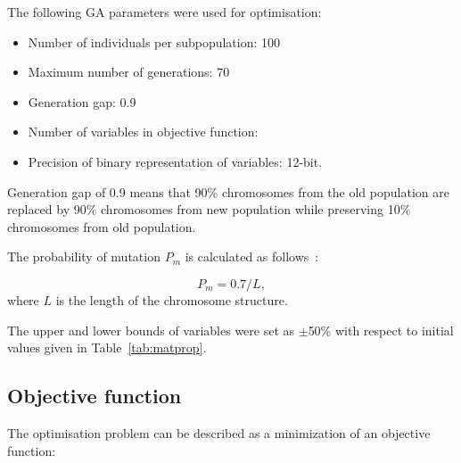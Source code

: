 	The following GA parameters were used for optimisation:
	\begin{itemize}
		\item Number of individuals per subpopulation: 100
		\item Maximum number of generations: 70
		\item Generation gap: 0.9
		\item Number of variables in objective function:  
		\item Precision of binary representation of variables: 12-bit.
   \end{itemize}
    Generation gap of 0.9 means that 90\% chromosomes from the old population are replaced by 90\%   chromosomes from new population while preserving 10\%   chromosomes from  old population.
    
    The probability of mutation \(P_m\) is calculated as follows~\cite{Chipperfield1994}:
    
\begin{equation}
    	P_m = 0.7/L,
    \end{equation}
 where \(L\) is the length of the chromosome structure.

The upper and lower bounds of variables were set as \(\pm\)50\% with respect to initial values given in Table~\ref{tab:matprop}.

\subsection{Objective function}
	
	The optimisation problem can be described as a minimization of an objective function:
	
